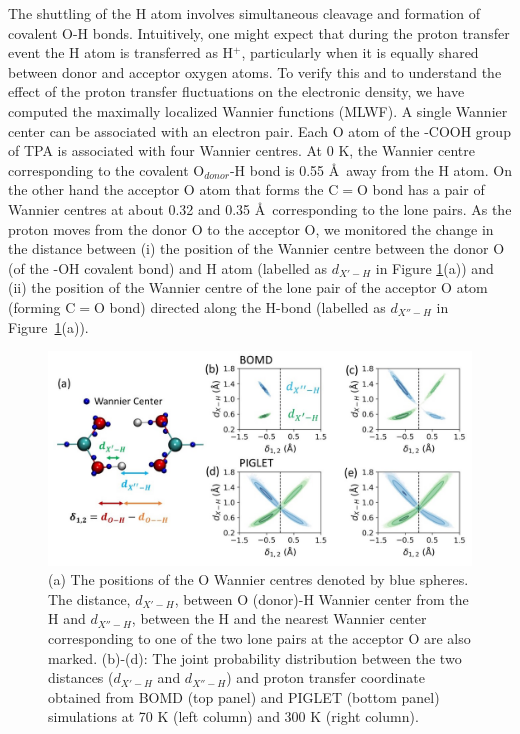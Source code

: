 The shuttling of the H atom involves simultaneous cleavage and formation of 
covalent O-H bonds. Intuitively, one might expect that during the proton 
transfer event the H atom is transferred as H$^+$, particularly when it is 
equally shared between donor and acceptor oxygen atoms. To 
verify this and to understand the effect of the proton transfer fluctuations on 
the electronic density, we have computed the maximally localized Wannier 
functions (MLWF)\cite{marzari1997maximally,marzari2012maximally}. A single 
Wannier center can be associated with an electron pair.
Each O atom of the -COOH group of TPA is associated with four Wannier centres.
At 0 K, the Wannier centre corresponding to the covalent O$_{donor}$-H bond
is 0.55 \AA~away from the H atom. On the other hand the acceptor O 
atom that forms the C$=$O bond has a pair of Wannier centres at about 
0.32 and 0.35 \AA~corresponding to the lone pairs. As the proton moves from
the donor O to the acceptor O, we monitored the change in the distance between (i) the position of the Wannier centre between the donor O (of the -OH covalent bond)
and H atom (labelled as $d_{X'-H}$ in Figure \ref{fig:wannier}(a)) and (ii)
the position of the Wannier centre of the lone pair of the acceptor O atom 
(forming C$=$O bond) directed along the H-bond (labelled as $d_{X''-H}$ in 
Figure~\ref{fig:wannier}(a)). 

\begin{figure}
\centering
\includegraphics[width=15cm ]{./Chapter1/new_figures/wannier.jpg}
\caption{ (a) The positions of the O Wannier centres denoted by blue spheres. The distance, $d_{X'-H}$, between O (donor)-H Wannier center from the H and $d_{X''-H}$, between the H and the nearest Wannier center corresponding to one of the two lone pairs at the acceptor O are also marked. (b)-(d): The joint probability distribution between the two distances ($d_{X'-H}$ and $d_{X''-H}$) and proton transfer coordinate obtained from BOMD (top panel) and PIGLET (bottom panel) simulations at 70 K (left column) and 300 K (right column).}
\label{fig:wannier}
\end{figure}

